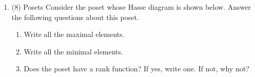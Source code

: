 \documentclass{amsart}
\begin{document}
\begin{enumerate}
\begin{enumerate}
\item (7 points) Write down the weighted adjacency matrix using the weights shown in the diagram. Paths of length zero are considered to have weight zero. Calculate the matrix that shows the minimum weight paths between any pair of vertices. Show your work.
\begin{solution}
The weighted adjacency matrix is
\[ W = \begin{pmatrix}
   0&1&1&\infty\\
   \infty&0&3&\infty\\
   \infty&\infty&0&2\\
   1&5&\infty&0
   \end{pmatrix}. \]
The minimum-weight path can be computed by the min-plus cube of this matrix.
We have
\[W^{\odot 2} = 
   \begin{pmatrix}
   0&1&1&3\\
   \infty&0&3&5\\
   3&7&0&2\\
   1&2&2&0
   \end{pmatrix},
   \]

and
\[W^{\odot 3}
   \begin{pmatrix}
   0&1&1&3\\
   6&0&3&5\\
   3&4&0&2\\
   1&2&2&0        
   \end{pmatrix}.\]
\end{solution}
\end{enumerate}
\item (8) Posets
\label{sec:org48012cc}
Consider the poset whose Hasse diagram is shown below.
Answer the following questions about this poset.
\begin{center}
\end{center}
\begin{enumerate}
\item Write all the maximal elements.
\item Write all the minimal elements.
\item Does the poset have a rank function? If yes, write one.  If not, why not?


\end{enumerate}
\end{enumerate}
\end{document}
